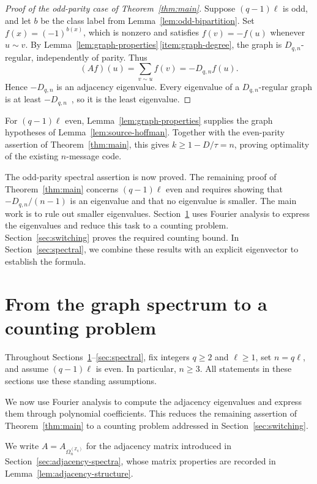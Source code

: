 \documentclass[11pt,a4paper]{article}
\numberwithin{equation}{section}
\numberwithin{figure}{section}
\numberwithin{table}{section}
\numberwithin{footnote}{section}
\theoremstyle{informal}\newtheorem*{informaltheorem}{Informal theorem}
\theoremstyle{definition}\newtheorem{example}{Example}[section]
\theoremstyle{remark}\newtheorem{remark}[theorem]{Remark}
\newcommand{\Z}{\mathbb Z}
\newcommand{\Om}{\Omega_n^{(\Z_q)}}
\begin{document}
\begin{proof}[Proof of the odd-parity case of Theorem~\ref{thm:main}]
Suppose \((q-1)\ell\) is odd, and let \(b\) be the class label
from Lemma~\ref{lem:odd-bipartition}. Set \(f(x)=(-1)^{b(x)}\),
which is nonzero and satisfies \(f(v)=-f(u)\) whenever \(u\sim v\).
By Lemma~\ref{lem:graph-properties}\,\ref{item:graph-degree}, the graph
is \(D_{q,n}\)-regular, independently of parity. Thus
\begin{equation}
 (Af)(u)=\sum_{v\sim u}f(v)=-D_{q,n}f(u).
\end{equation}
Hence \(-D_{q,n}\) is an adjacency eigenvalue. Every eigenvalue
of a \(D_{q,n}\)-regular graph is at least
\(-D_{q,n}\)~\cite[Sec.~3.1]{bh}, so it is the least eigenvalue.
\end{proof}

For \((q-1)\ell\) even, Lemma~\ref{lem:graph-properties} supplies
the graph hypotheses of Lemma~\ref{lem:source-hoffman}. Together with
the even-parity assertion of Theorem~\ref{thm:main}, this gives
\(k\geq1-D/\tau=n\), proving optimality of the existing
\(n\)-message code.

The odd-parity spectral assertion is now proved. The remaining proof of
Theorem~\ref{thm:main} concerns \((q-1)\ell\) even and requires
showing that \(-D_{q,n}/(n-1)\) is an eigenvalue and that no eigenvalue
is smaller. The main work is to rule out smaller eigenvalues.
Section~\ref{sec:fourier} uses Fourier analysis to express the
eigenvalues and reduce this task to a counting problem.
Section~\ref{sec:switching} proves the required counting bound.
In Section~\ref{sec:spectral}, we combine these results with an
explicit eigenvector to establish the formula.

\section{From the graph spectrum to a counting problem}\label{sec:fourier}
Throughout Sections~\ref{sec:fourier}--\ref{sec:spectral}, fix integers
\(q\geq2\) and \(\ell\geq1\), set \(n=q\ell\), and assume
\((q-1)\ell\) is even. In particular, \(n\geq3\).
All statements in these sections use these standing assumptions.

We now use Fourier analysis to compute the adjacency eigenvalues
and express them through polynomial coefficients. This reduces the
remaining assertion of Theorem~\ref{thm:main} to a counting problem
addressed in Section~\ref{sec:switching}.

We write \(A=A_{\Om}\) for the adjacency matrix
introduced in Section~\ref{sec:adjacency-spectra}, whose matrix
properties are recorded in Lemma~\ref{lem:adjacency-structure}.
\end{document}
